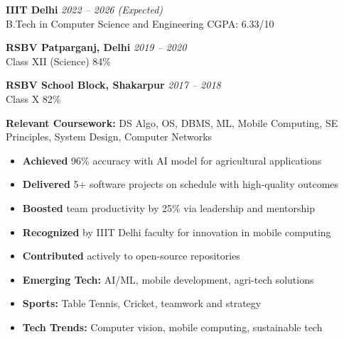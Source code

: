 \documentclass[10pt]{extarticle}
\begin{document}
\vspace{8pt}

\begin{contained}
\vspace{5pt}

\textbf{IIIT Delhi} \hfill \textit{2022 – 2026 (Expected)}\\
B.Tech in Computer Science and Engineering \hfill CGPA: 6.33/10

\vspace{6pt}

\textbf{RSBV Patparganj, Delhi} \hfill \textit{2019 – 2020}\\
Class XII (Science) \hfill 84\%

\vspace{6pt}

\textbf{RSBV School Block, Shakarpur} \hfill \textit{2017 – 2018}\\
Class X \hfill 82\%

\vspace{8pt}

\textbf{Relevant Coursework:} DS Algo, OS, DBMS, ML, Mobile Computing, SE Principles, System Design, Computer Networks
\end{contained}

\vspace{8pt}

\begin{contained}
\begin{itemize}
    \item \textbf{Achieved} 96\% accuracy with AI model for agricultural applications
    \item \textbf{Delivered} 5+ software projects on schedule with high-quality outcomes
    \item \textbf{Boosted} team productivity by 25\% via leadership and mentorship
    \item \textbf{Recognized} by IIIT Delhi faculty for innovation in mobile computing
    \item \textbf{Contributed} actively to open-source repositories
\end{itemize}
\end{contained}

\vspace{8pt}

\begin{contained}
\begin{itemize}
    \item \textbf{Emerging Tech:} AI/ML, mobile development, agri-tech solutions
    \item \textbf{Sports:} Table Tennis, Cricket, teamwork and strategy
    \item \textbf{Tech Trends:} Computer vision, mobile computing, sustainable tech
\end{itemize}
\end{contained}
\end{document}
